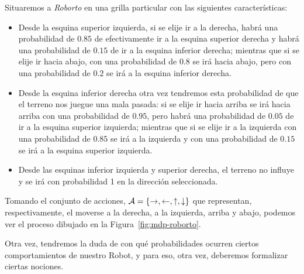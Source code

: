 Situaremos a \emph{Roborto} en una grilla particular con las siguientes
características:
\begin{itemize}
	\item Desde la esquina superior izquierda, si se elije ir a la derecha, habrá una
	      probabilidad de $0.85$ de efectivamente ir a la esquina superior derecha y
	      habrá una probabilidad de $0.15$ de ir a la esquina inferior derecha; mientras
	      que si se elije ir hacia abajo, con una probabilidad de $0.8$ se irá hacia
	      abajo, pero con una probabilidad de $0.2$ se irá a la esquina inferior derecha.
	\item Desde la esquina inferior derecha otra vez tendremos esta probabilidad de que
	      el terreno nos juegue una mala pasada: si se elije ir hacia arriba se irá hacia
	      arriba con una probabilidad de $0.95$, pero habrá una probabilidad de $0.05$ de
	      ir a la esquina superior izquierda; mientras que si se elije ir a la izquierda
	      con una probabilidad de $0.85$ se irá a la izquierda y con una probabilidad de
	      $0.15$ se irá a la esquina superior izquierda.
	\item Desde las esquinas inferior izquierda y superior derecha, el terreno no influye
	      y se irá con probabilidad 1 en la dirección seleccionada.
\end{itemize}

Tomando el conjunto de acciones, $\mathcal{A} = \{\rightarrow, \leftarrow, \uparrow,
	\downarrow\}$ que representan, respectivamente, el moverse a la derecha, a la
izquierda, arriba y abajo, podemos ver el proceso dibujado en la
Figura~\ref{fig:mdp-roborto}.

Otra vez, tendremos la duda de con qué probabilidades ocurren ciertos
comportamientos de nuestro Robot, y para eso, otra vez, deberemos formalizar
ciertas nociones.

